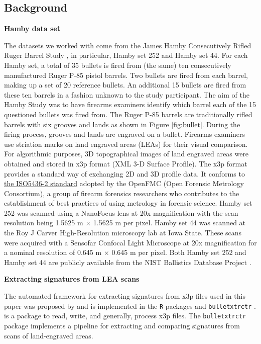 \hypertarget{background}{%
\subsection{Background}\label{background}}

\textbf{Hamby data set}

The datasets we worked with come from the James Hamby Consecutively
Rifled Ruger Barrel Study \citep{brundage, hamby, Hamby:2019}, in
particular, Hamby set 252 and Hamby set 44. For each Hamby set, a total
of 35 bullets is fired from (the same) ten consecutively manufactured
Ruger P-85 pistol barrels. Two bullets are fired from each barrel,
making up a set of 20 reference bullets. An additional 15 bullets are
fired from these ten barrels in a fashion unknown to the study
participant. The aim of the Hamby Study was to have firearms examiners
identify which barrel each of the 15 questioned bullets was fired from.
The Ruger P-85 barrels are traditionally rifled barrels with six grooves
and lands as shown in Figure \ref{fig:bullet}. During the firing
process, grooves and lands are engraved on a bullet. Firearms examiners
use striation marks on land engraved areas (LEAs) for their visual
comparison. For algorithmic purposes, 3D topographical images of land
engraved areas were obtained and stored in x3p format (XML 3-D Surface
Profile). The x3p format provides a standard way of exchanging 2D and 3D
profile data. It conforms to
\href{http://sourceforge.net/p/open-gps/mwiki/X3p/}{the ISO5436-2
standard} adopted by the OpenFMC (Open Forensic Metrology Consortium), a
group of firearm forensics researchers who contributes to the
establishment of best practices of using metrology in forensic science.
Hamby set 252 was scanned using a NanoFocus lens at 20x magnification
with the scan resolution being 1.5625 \textmu m \(\times\) 1.5625
\textmu m per pixel. Hamby set 44 was scanned at the Roy J Carver
High-Resolution microscopy lab at Iowa State. These scans were acquired
with a Sensofar Confocal Light Microscope at 20x magnification for a
nominal resolution of 0.645 \textmu m \(\times\) 0.645 \textmu m per
pixel. Both Hamby set 252 and Hamby set 44 are publicly available from
the NIST Ballistics Database Project \citep{nistdb}.

\textbf{Extracting signatures from LEA scans}

The automated framework for extracting signatures from x3p files used in
this paper was proposed by \citet{aoas} and is implemented in the
\texttt{R} packages  \citep{x3ptools} and
\texttt{bulletxtrctr} \citep{bulletxtrctr}.  is a package
to read, write, and generally, process x3p files. The
\texttt{bulletxtrctr} package implements a pipeline for extracting and
comparing signatures from scans of land-engraved areas.

